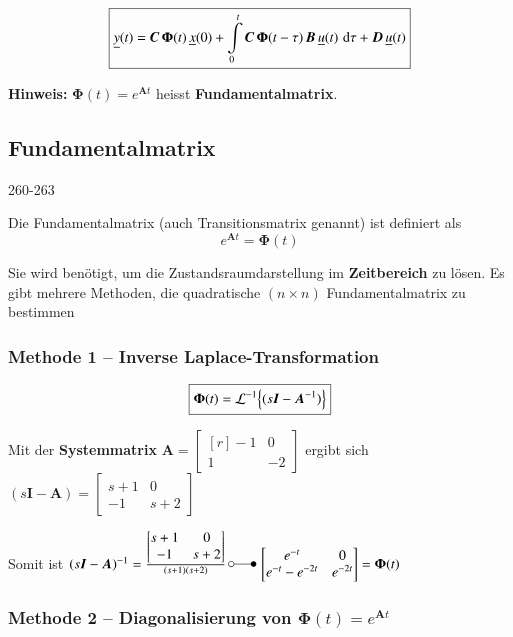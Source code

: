 $$ \boxed{ \underline{y}(t) = \bm{C} \, \bm{\Phi}(t) \, \underline{x}(0) + 
    \int\limits_0^t \bm{C} \, \bm{\Phi}(t - \tau) \, \bm{B} \, \underline{u}(t) \, \mathop{} \! \mathrm{d} \tau + \bm{D} \, \underline{u}(t) } $$

\textbf{Hinweis:} $\bm{\Phi}(t) = e^{\bm{A} t}$ heisst \textbf{Fundamentalmatrix}. 


\subsection{Fundamentalmatrix}{260-263}

Die Fundamentalmatrix (auch Transitionsmatrix genannt) ist definiert als
$$ \boxed{  e^{\bm{A} t} = \bm{\Phi}(t) } $$

Sie wird benötigt, um die Zustandsraumdarstellung im \textbf{Zeitbereich} zu lösen.
Es gibt mehrere Methoden, die quadratische $(n \times n)$ Fundamentalmatrix zu bestimmen


\subsubsection{Methode 1 -- Inverse Laplace-Transformation}

$$ \boxed{ \bm{\Phi}(t) = \mathcal{L}^{-1} \Bigl\{ (s \bm{I} - \bm{A}^{-1})  \Bigr\} } $$



Mit der \textbf{Systemmatrix} $\bm{A} = \begin{bmatrix*}[r] -1 & 0 \\ 1 & -2 \end{bmatrix*}$ ergibt sich 
$(s \bm{I} - \bm{A}) = \begin{bmatrix*} s+1 & 0 \\ -1 & s+2 \end{bmatrix*}$

Somit ist $(s \bm{I} - \bm{A})^{-1} = \frac{\begin{bmatrix*} s+1 & 0 \\ -1 & s+2 \end{bmatrix*}}{(s+1)(s+2)} \,
\laplace \, \begin{bmatrix*} e^{-t} & 0 \\ e^{-t} - e^{-2t} & e^{-2t} \end{bmatrix*} = \bm{\Phi}(t)$


\subsubsection{Methode 2 -- Diagonalisierung von $\bm{\Phi}(t) = e^{\bm{A} t}$}


